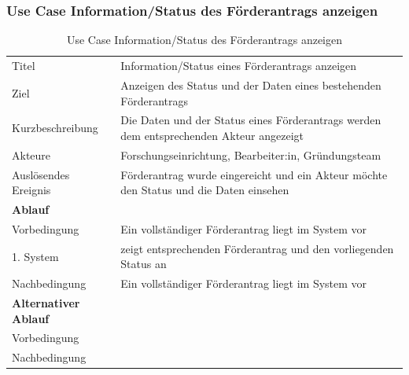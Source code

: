 \documentclass{article}
\begin{document}
\subsubsection{Use Case Information/Status des Förderantrags anzeigen}
\begin{table}[htbp]
\centering
\begin{tabularx}{\textwidth}{lX}
\midrule
Titel & Information/Status eines Förderantrags anzeigen\\
Ziel & Anzeigen des Status und der Daten eines bestehenden Förderantrags\\
Kurzbeschreibung & Die Daten und der Status eines Förderantrags werden dem entsprechenden Akteur angezeigt \\
Akteure & Forschungseinrichtung, Bearbeiter:in, Gründungsteam\\
Auslösendes Ereignis & Förderantrag wurde eingereicht und ein Akteur möchte den Status und die Daten einsehen\\
\textbf{Ablauf} \\
Vorbedingung & Ein vollständiger Förderantrag liegt im System vor\\
\hspace{0.5cm} 1. System & zeigt entsprechenden Förderantrag und den vorliegenden Status an\\
Nachbedingung & Ein vollständiger Förderantrag liegt im System vor\\
\textbf{Alternativer Ablauf} \\
Vorbedingung & \\

Nachbedingung & \\
\bottomrule
\end{tabularx}
\caption{Use Case Information/Status des Förderantrags anzeigen}
\end{table}
\newpage
\end{document}
